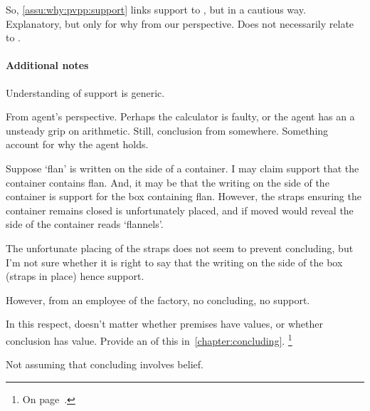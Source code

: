 \begin{note}
  So, \autoref{assu:why:pvpp:support} links support to \qWhy{}, but in a cautious way.
  Explanatory, but only for why from our perspective.
  Does not necessarily relate to \qHow{}.
\end{note}

\paragraph{Additional notes}

\begin{note}
  Understanding of support is generic.

  From agent's perspective.
  Perhaps the calculator is faulty, or the agent has an a unsteady grip on arithmetic.
  Still, conclusion from somewhere.
  Something account for why the agent holds.
\end{note}

\begin{note}
    \begin{illustration}
    \label{illu:flan-nels}
    Suppose `flan' is written on the side of a container.
    I may claim support that the container contains flan.
    And, it may be that the writing on the side of the container is support for the box containing flan.
    However, the straps ensuring the container remains closed is unfortunately placed, and if moved would reveal the side of the container reads `flannels'.
  \end{illustration}

  The unfortunate placing of the straps does not seem to prevent concluding, but I'm not sure whether it is right to say that the writing on the side of the box (straps in place) hence support.

  However, from an employee of the factory, no concluding, no support.
\end{note}

\begin{note}
  In this respect, doesn't matter whether premises have values, or whether conclusion has value.
  Provide an  of this in~\autoref{chapter:concluding}.%
  \footnote{
    \color{red}
    On page~\pageref{concluding:not-factive}.
  }
\end{note}

\begin{note}
  {
    \color{red}
    Not assuming that concluding involves belief.
  }
\end{note}

